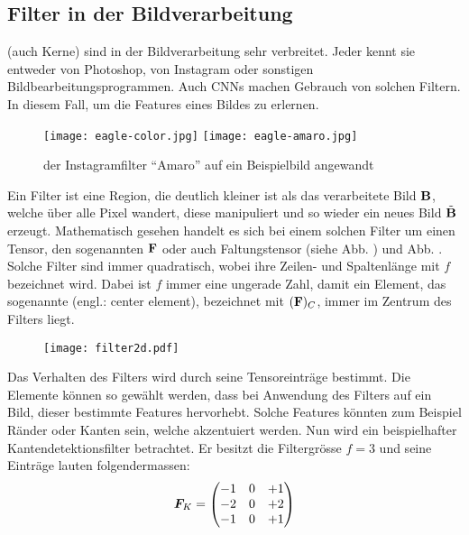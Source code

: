 \subsection{Filter in der Bildverarbeitung}
 (auch Kerne) sind in der Bildverarbeitung sehr verbreitet. Jeder kennt sie entweder
von Photoshop, von Instagram oder sonstigen Bildbearbeitungsprogrammen.
Auch CNNs machen Gebrauch von solchen Filtern. In diesem Fall, um die Features eines Bildes zu
erlernen.

\begin{figure}[h!]
  \centering
  \texttt{[image: eagle-color.jpg]}
  \texttt{[image: eagle-amaro.jpg]}
  \caption{der Instagramfilter ``Amaro'' auf ein Beispielbild angewandt \cite{res:eagle_image}}
\end{figure}

\para{}
Ein Filter ist eine Region, die deutlich kleiner ist als das verarbeitete Bild
$\mathbf{B}$, welche über alle Pixel wandert, diese manipuliert und so wieder ein neues Bild
$\tilde{\mathbf{B}}$ erzeugt.
Mathematisch gesehen handelt es sich bei einem solchen Filter um einen Tensor,
den sogenannten  $\mathbf{F}$ oder auch Faltungstensor (siehe Abb.
) und Abb. . Solche Filter sind immer quadratisch, wobei ihre
Zeilen- und Spaltenlänge mit $f$ bezeichnet wird. Dabei ist $f$ immer eine ungerade Zahl, damit ein
Element, das sogenannte  (engl.: center element), bezeichnet mit $(\mathbf{F})_C$,
immer im Zentrum des Filters liegt. \\

\begin{figure}[h!]
  \centering
  \texttt{[image: filter2d.pdf]}
  \label{fig:filter2d}
\end{figure}
\para{}
Das Verhalten des Filters wird durch seine Tensoreinträge bestimmt.
Die Elemente können so gewählt werden, dass bei Anwendung des Filters auf
ein Bild, dieser bestimmte Features hervorhebt. Solche Features
könnten zum Beispiel Ränder oder Kanten sein, welche akzentuiert werden.
\para{}
Nun wird ein beispielhafter Kantendetektionsfilter betrachtet. Er besitzt die
Filtergrösse $f=3$ und seine Einträge lauten folgendermassen:
\begin{equation*}
  \bm{F}_K =
  \begin{pmatrix}
    -1 & 0 & +1 \\
    -2 & 0 & +2 \\
    -1 & 0 & +1 \\
  \end{pmatrix}
\end{equation*}


